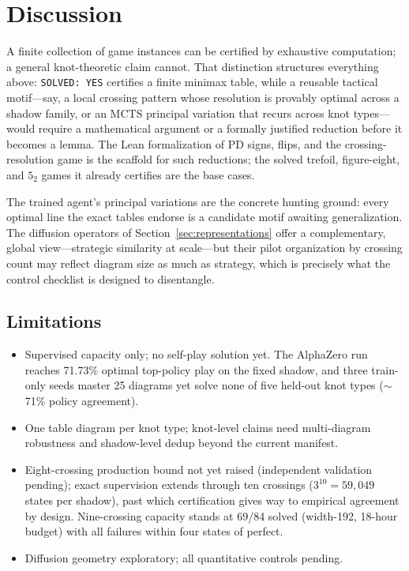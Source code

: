 \section{Discussion}
\label{sec:discussion}

A finite collection of game instances can be certified by exhaustive
computation; a general knot-theoretic claim cannot. That distinction structures
everything above: \texttt{SOLVED: YES} certifies a finite minimax table, while
a reusable tactical motif---say, a local crossing pattern whose resolution is
provably optimal across a shadow family, or an MCTS principal variation that
recurs across knot types---would require a mathematical argument or a formally
justified reduction before it becomes a lemma. The Lean formalization of PD
signs, flips, and the crossing-resolution game is the scaffold for such
reductions; the solved trefoil, figure-eight, and $5_2$ games it already
certifies are the base cases.

The trained agent's principal variations are the concrete hunting ground: every
optimal line the exact tables endorse is a candidate motif awaiting
generalization. The diffusion operators of Section~\ref{sec:representations}
offer a complementary, global view---strategic similarity at scale---but their
pilot organization by crossing count may reflect diagram size as much as
strategy, which is precisely what the control checklist is designed to
disentangle.

\subsection{Limitations}
\label{sec:limitations}

\begin{itemize}
    \item Supervised capacity only; no self-play solution yet. The AlphaZero
        run reaches 71.73\% optimal top-policy play on the fixed shadow, and
        three train-only seeds master 25 diagrams yet solve none of five
        held-out knot types ($\sim$71\% policy agreement).
    \item One table diagram per knot type; knot-level claims need multi-diagram
        robustness and shadow-level dedup beyond the current manifest.
    \item Eight-crossing production bound not yet raised (independent
        validation pending); exact supervision extends through ten crossings
        ($3^{10} = 59{,}049$ states per shadow), past which certification
        gives way to empirical agreement by design. Nine-crossing capacity
        stands at 69/84 solved (width-192, 18-hour budget) with all failures
        within four states of perfect.
    \item Diffusion geometry exploratory; all quantitative controls pending.
\end{itemize}

